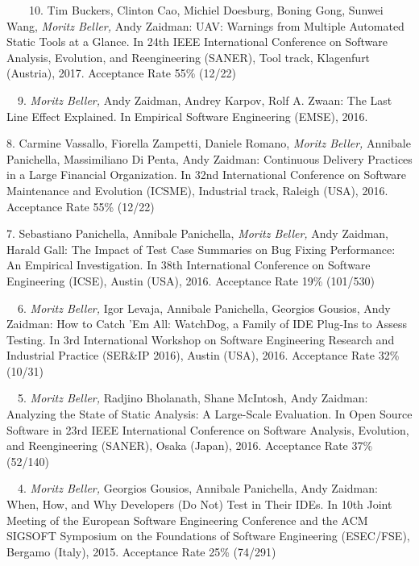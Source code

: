 \begin{etaremune}
{\item[\faTrophy~~\faFileTextO~~10.] Tim Buckers, Clinton Cao, Michiel Doesburg, Boning Gong, Sunwei
  Wang, \emph{Moritz Beller,} Andy Zaidman: UAV: Warnings from Multiple Automated Static Tools at
  a Glance. In 24th IEEE International Conference on Software Analysis, Evolution, and
  Reengineering (SANER), Tool track, Klagenfurt (Austria), 2017.  Acceptance Rate 55\% (12/22)

\item[\faFileTextO~~9.] \emph{Moritz Beller,} Andy Zaidman, Andrey Karpov, Rolf A. Zwaan: The
  Last Line Effect Explained. In Empirical Software Engineering (EMSE), 2016.

\item[8.] Carmine Vassallo, Fiorella Zampetti, Daniele Romano, \emph{Moritz Beller,} Annibale
  Panichella, Massimiliano Di Penta, Andy Zaidman: Continuous Delivery Practices in a Large
  Financial Organization. In 32nd International Conference on Software Maintenance and Evolution
  (ICSME), Industrial track, Raleigh (USA), 2016. Acceptance Rate 55\% (12/22)

\item[7.] Sebastiano Panichella, Annibale Panichella, \emph{Moritz Beller,} Andy Zaidman, Harald
  Gall: The Impact of Test Case Summaries on Bug Fixing Performance: An Empirical Investigation. In
  38th International Conference on Software Engineering (ICSE), Austin (USA), 2016. Acceptance Rate
  19\% (101/530)

\item[\faFileTextO~~6.] \emph{Moritz Beller,} Igor Levaja, Annibale Panichella, Georgios Gousios,
  Andy Zaidman: How to Catch ’Em All: WatchDog, a Family of IDE Plug-Ins to Assess Testing. In 3rd
  International Workshop on Software Engineering Research and Industrial Practice (SER\&IP 2016),
  Austin (USA), 2016. Acceptance Rate 32\% (10/31)

\item[\faFileTextO~~5.] \emph{Moritz Beller,} Radjino Bholanath, Shane McIntosh, Andy
  Zaidman: Analyzing the State of Static Analysis: A Large-Scale Evaluation. In Open Source
  Software in 23rd IEEE International Conference on Software Analysis, Evolution, and Reengineering
  (SANER), Osaka (Japan), 2016. Acceptance Rate 37\% (52/140)

\item[\faFileTextO~~4.] \emph{Moritz Beller,} Georgios Gousios, Annibale Panichella, Andy
  Zaidman: When, How, and Why Developers (Do Not) Test in Their IDEs. In 10th Joint Meeting of the
  European Software Engineering Conference and the ACM SIGSOFT Symposium on the Foundations of
  Software Engineering (ESEC/FSE), Bergamo (Italy), 2015. Acceptance Rate 25\% (74/291)

}
\end{etaremune}
